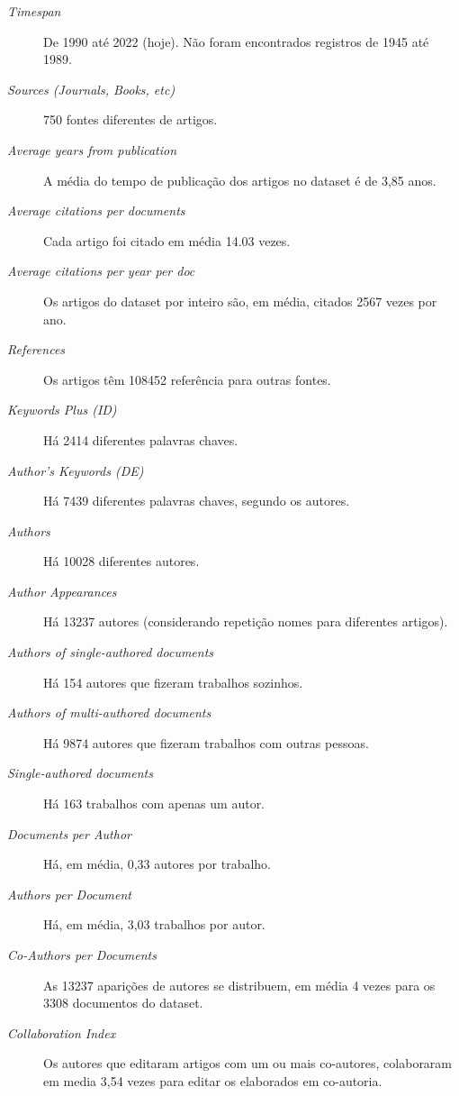 \begin{description}
    \item [\textit{Timespan}] De 1990 até 2022 (hoje). Não foram encontrados registros de 1945 até 1989.
    \item [\textit{Sources (Journals, Books, etc)}] 750 fontes diferentes de artigos.
    \item [\textit{Average years from publication}] A média do tempo de publicação dos artigos no dataset é de 3,85 anos.
    \item [\textit{Average citations per documents}] Cada artigo foi citado em média 14.03 vezes.
    \item [\textit{Average citations per year per doc}] Os artigos do dataset por inteiro são, em média, citados 2567 vezes por ano.
    \item [\textit{References}] Os artigos têm 108452 referência para outras fontes. 
    \item [\textit{Keywords Plus (ID)}] Há 2414 diferentes palavras chaves.
    \item [\textit{Author's Keywords (DE)}] Há 7439 diferentes palavras chaves, segundo os autores.
    \item [\textit{Authors}] Há 10028 diferentes autores.
    \item [\textit{Author Appearances}] Há 13237 autores (considerando repetição nomes para diferentes artigos).
    \item [\textit{Authors of single-authored documents}] Há 154 autores que fizeram trabalhos sozinhos.
    \item [\textit{Authors of multi-authored documents}] Há 9874 autores que fizeram trabalhos com outras pessoas.
    \item [\textit{Single-authored documents}] Há 163 trabalhos com apenas um autor.
    \item [\textit{Documents per Author}] Há, em média, 0,33 autores por trabalho.
    \item [\textit{Authors per Document}] Há, em média, 3,03 trabalhos por autor.
    \item [\textit{Co-Authors per Documents}] As 13237 aparições de autores se distribuem, em média 4 vezes para os 3308 documentos do dataset.
    \item [\textit{Collaboration Index}] Os autores que editaram artigos com um ou mais co-autores, colaboraram em media 3,54 vezes para editar os elaborados em co-autoria.
\end{description}

